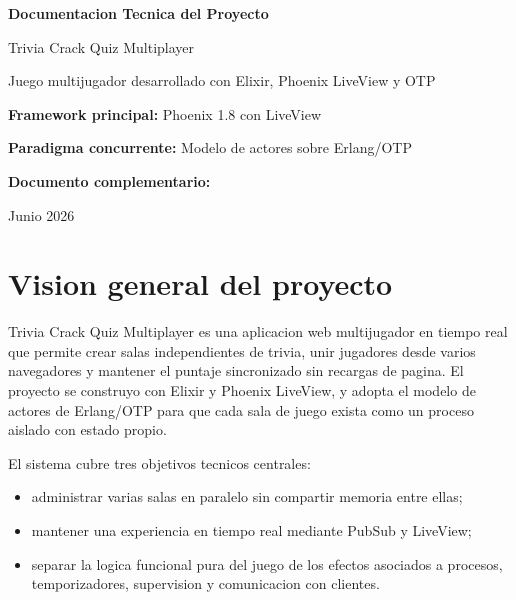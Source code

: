 \documentclass[12pt,a4paper]{article}
\begin{document}
\begin{titlepage}
  \centering
  \vspace*{2cm}

  {\Huge \textbf{Documentacion Tecnica del Proyecto}\par}
  \vspace{0.5cm}
  {\LARGE Trivia Crack Quiz Multiplayer\par}
  \vspace{1.5cm}

  {\large Juego multijugador desarrollado con Elixir, Phoenix LiveView y OTP\par}
  \vspace{1cm}

  {\large \textbf{Framework principal:} Phoenix 1.8 con LiveView\par}
  \vspace{0.2cm}
  {\large \textbf{Paradigma concurrente:} Modelo de actores sobre Erlang/OTP\par}
  \vspace{0.2cm}
  {\large \textbf{Documento complementario:} \par}

  \vfill

  {\large Junio 2026\par}
\end{titlepage}

\tableofcontents
\newpage

\section{Vision general del proyecto}

Trivia Crack Quiz Multiplayer es una aplicacion web multijugador en tiempo real
que permite crear salas independientes de trivia, unir jugadores desde varios
navegadores y mantener el puntaje sincronizado sin recargas de pagina. El
proyecto se construyo con Elixir y Phoenix LiveView, y adopta el modelo de
actores de Erlang/OTP para que cada sala de juego exista como un proceso
aislado con estado propio.

El sistema cubre tres objetivos tecnicos centrales:

\begin{itemize}
  \item administrar varias salas en paralelo sin compartir memoria entre ellas;
  \item mantener una experiencia en tiempo real mediante PubSub y LiveView;
  \item separar la logica funcional pura del juego de los efectos asociados a
  procesos, temporizadores, supervision y comunicacion con clientes.
\end{itemize}
\end{document}
